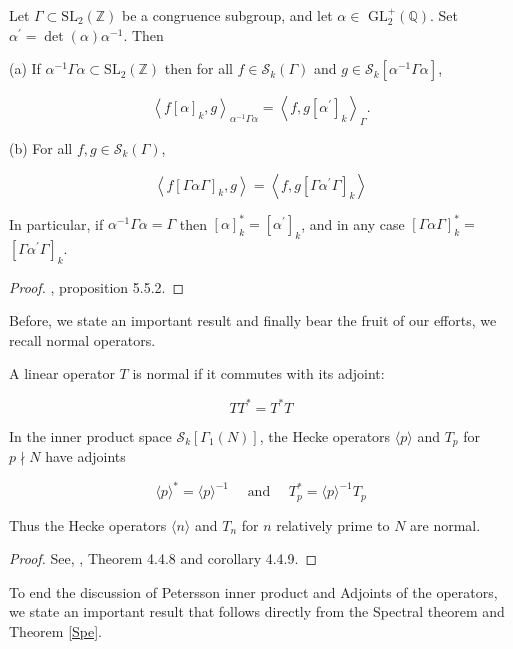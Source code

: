 \begin{proposition}
    Let $\Gamma \subset \mathrm{SL}_{2}(\mathbb{Z})$ be a congruence subgroup, and let $\alpha \in$ $\mathrm{GL}_{2}^{+}(\mathbb{Q})$. Set $\alpha^{\prime}=\operatorname{det}(\alpha) \alpha^{-1}$. Then

(a) If $\alpha^{-1} \Gamma \alpha \subset \mathrm{SL}_{2}(\mathbb{Z})$ then for all $f \in \mathcal{S}_{k}(\Gamma)$ and $g \in \mathcal{S}_{k}\left[\alpha^{-1} \Gamma \alpha\right]$,

$$
\left\langle f[\alpha]_{k}, g\right\rangle_{\alpha^{-1} \Gamma \alpha}=\left\langle f, g\left[\alpha^{\prime}\right]_{k}\right\rangle_{\Gamma} .
$$

(b) For all $f, g \in \mathcal{S}_{k}(\Gamma)$,

$$
\left\langle f[\Gamma \alpha \Gamma]_{k}, g\right\rangle=\left\langle f, g\left[\Gamma \alpha^{\prime} \Gamma\right]_{k}\right\rangle
$$

In particular, if $\alpha^{-1} \Gamma \alpha=\Gamma$ then $[\alpha]_{k}^{*}=\left[\alpha^{\prime}\right]_{k}$, and in any case $[\Gamma \alpha \Gamma]_{k}^{*}=$ $\left[\Gamma \alpha^{\prime} \Gamma\right]_{k}$.
\begin{proof}
    \cite{diamond2005first}, proposition 5.5.2.
\end{proof}
\end{proposition}

Before, we state an important result and finally bear the fruit of our efforts, we recall normal operators. 

\begin{definition}
    A linear operator $T$ is normal if it commutes with its adjoint:

$$
T T^{*}=T^{*} T
$$

\end{definition}

\begin{theorem}\label{Spe}
    In the inner product space $\mathcal{S}_{k}\left[\Gamma_{1}(N)\right]$, the Hecke operators $\langle p\rangle$ and $T_{p}$ for $p \nmid N$ have adjoints

$$
\langle p\rangle^{*}=\langle p\rangle^{-1} \quad \text { and } \quad T_{p}^{*}=\langle p\rangle^{-1} T_{p}
$$

Thus the Hecke operators $\langle n\rangle$ and $T_{n}$ for $n$ relatively prime to $N$ are normal.
\end{theorem}

\begin{proof}
    See, \cite{Masdeu2015ModularForms}, Theorem 4.4.8 and corollary 4.4.9.
\end{proof}
To end the discussion of Petersson inner product and Adjoints of the operators, we state an important result that follows directly from the Spectral theorem and Theorem \ref{Spe}. 


